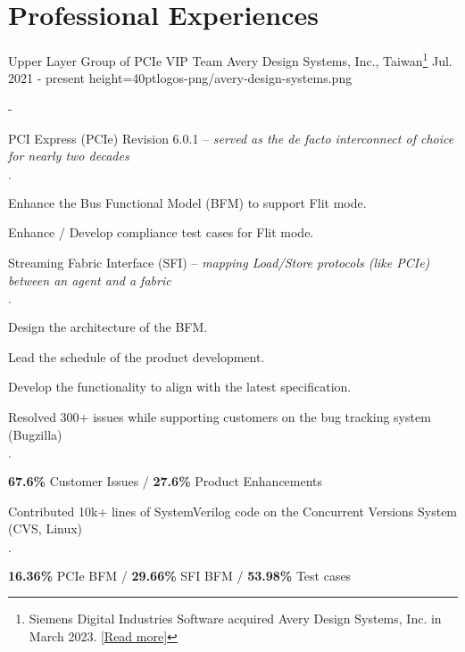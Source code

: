 \documentclass{cvclass}
\begin{document}
\makeinfo


\section{Professional Experiences}

    {Upper Layer Group of PCIe VIP Team}
    {Avery Design Systems, Inc., Taiwan\footnote{Siemens Digital Industries Software acquired Avery Design Systems, Inc. in March 2023. \href{https://newsroom.sw.siemens.com/en-US/siemens-avery-design-systems/}{[Read more]}}}
    {Jul. 2021 - present}
    {height=40pt}{logos-png/avery-design-systems.png}
\begin{plainitemize}{-}
    \item PCI Express\textsuperscript{\tiny\textregistered} (PCIe) Revision 6.0.1 -- \textit{served as the de facto interconnect of choice for nearly two decades}
    \begin{plainitemize}{\(\cdot\)}
        \item Enhance the Bus Functional Model (BFM) to support Flit mode.
        \item Enhance / Develop compliance test cases for Flit mode.
    \end{plainitemize}
    \item Streaming Fabric Interface (SFI) -- \textit{mapping Load/Store protocols (like PCIe) between an agent and a fabric}
    \begin{plainitemize}{\(\cdot\)}
        \item Design the architecture of the BFM.
        \item Lead the schedule of the product development.
        \item Develop the functionality to align with the latest specification.
    \end{plainitemize}
    \item Resolved 300+ issues while supporting customers on the bug tracking system (Bugzilla)
    \begin{plainitemize}{\(\cdot\)}
        \item {\textbf{67.6\%} Customer Issues / \textbf{27.6\%} Product Enhancements}
    \end{plainitemize}
    \item Contributed 10k+ lines of SystemVerilog code on the Concurrent Versions System (CVS, Linux)
    \begin{plainitemize}{\(\cdot\)}
        \item \textbf{16.36\%} PCIe BFM / \textbf{29.66\%} SFI BFM / \textbf{53.98\%} Test cases
    \end{plainitemize}
\end{plainitemize}
\end{document}
